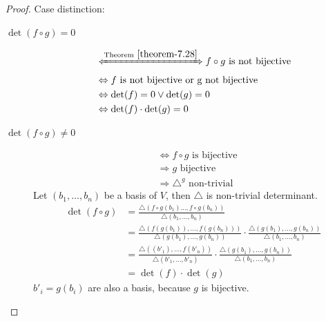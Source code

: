 \documentclass[a4paper,landscape,twocolumn]{article}
\begin{document}
\begin{proof}
  Case distinction:
  \begin{description}
    \item[$\det(f \circ g) = 0$]
      \begin{align*}
        &\xLeftrightarrow{\text{Theorem}~\ref{theorem-7.28}} f \circ g \text{ is not bijective} \\
        &\Leftrightarrow f \text{ is not bijective or g not bijective}  \\
        &\Leftrightarrow \det(f) = 0 \lor \det(g) = 0 \\
        &\Leftrightarrow \det(f) \cdot \det(g) = 0
      \end{align*}
    \item[$\det(f \circ g) \neq 0$]
      \begin{align*}
        &\Leftrightarrow f \circ g \text{ is bijective} \\
        &\Rightarrow g \text{ bijective} \\
        &\Rightarrow \triangle^g \text{ non-trivial}
      \end{align*}
      Let $(b_1, \ldots, b_n)$ be a basis of $V$, then $\triangle$ is non-trivial determinant.
      \begin{align*}
        \det(f \circ g)
          &= \frac{\triangle(f\circ g(b_1) \ldots, f \circ g(b_n))}{\triangle (b_1, \ldots, b_n)} \\
          &= \frac{\triangle(f(g(b_1)), \ldots, f(g(b_n)))}{\triangle (g(b_1), \ldots, g(b_n))} \cdot \frac{\triangle (g(b_1), \ldots, g(b_n))}{\triangle(b_1, \ldots, b_n)} \\
          &= \frac{\triangle((b'_1), \ldots, f(b'_n))}{\triangle (b'_1, \ldots, b'_n)} \cdot \frac{\triangle (g(b_1), \ldots, g(b_n))}{\triangle(b_1, \ldots, b_n)} \\
          &= \det(f) \cdot \det(g)
      \end{align*}
      $b'_i = g(b_i)$ are also a basis, because $g$ is bijective.
  \end{description}
\end{proof}
\end{document}
